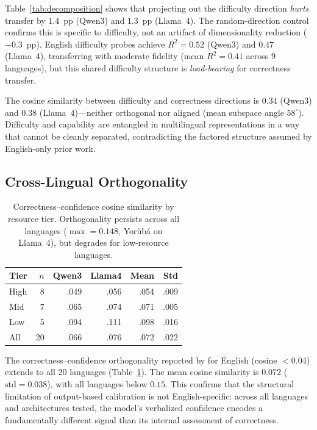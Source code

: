 \documentclass[11pt,a4paper]{article}
\begin{document}
Table~\ref{tab:decomposition} shows that projecting out the difficulty direction \emph{hurts} transfer by $1.4$~pp (Qwen3) and $1.3$~pp (Llama~4).
The random-direction control confirms this is specific to difficulty, not an artifact of dimensionality reduction ($-0.3$~pp).
English difficulty probes achieve $R^2{=}0.52$ (Qwen3) and $0.47$ (Llama~4), transferring with moderate fidelity (mean $R^2{=}0.41$ across 9 languages), but this shared difficulty structure is \emph{load-bearing} for correctness transfer.

The cosine similarity between difficulty and correctness directions is $0.34$ (Qwen3) and $0.38$ (Llama~4)---neither orthogonal nor aligned (mean subspace angle $58^\circ$).
Difficulty and capability are entangled in multilingual representations in a way that cannot be cleanly separated, contradicting the factored structure assumed by English-only prior work.

\subsection{Cross-Lingual Orthogonality}

\begin{table}[t]
\centering
\small
\begin{tabular}{lrrrrr}
\toprule
\textbf{Tier} & $n$ & \textbf{Qwen3} & \textbf{Llama4} & \textbf{Mean} & \textbf{Std} \\
\midrule
High & 8  & .049 & .056 & .054 & .009 \\
Mid  & 7  & .065 & .074 & .071 & .005 \\
Low  & 5  & .094 & .111 & .098 & .016 \\
\midrule
All  & 20 & .066 & .076 & .072 & .022 \\
\bottomrule
\end{tabular}
\caption{Correctness--confidence cosine similarity by resource tier. Orthogonality persists across all languages ($\max{=}0.148$, Yor\`{u}b\'{a} on Llama~4), but degrades for low-resource languages.}
\label{tab:orthogonality}
\end{table}

The correctness--confidence orthogonality reported by \citet{miao-ungar-2026} for English (cosine $< 0.04$) extends to all 20 languages (Table~\ref{tab:orthogonality}).
The mean cosine similarity is $0.072$ ($\text{std}{=}0.038$), with all languages below $0.15$.
This confirms that the structural limitation of output-based calibration is not English-specific: across all languages and architectures tested, the model's verbalized confidence encodes a fundamentally different signal than its internal assessment of correctness.
\end{document}
